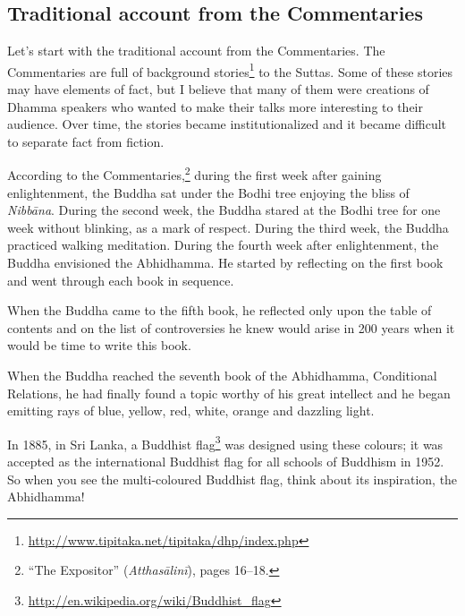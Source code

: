 \pagebreak

\subsection*{Traditional account from the Commentaries}

Let’s start with the traditional account from the Commentaries. The Commentaries are full of background stories\footnote{\url{http://www.tipitaka.net/tipitaka/dhp/index.php}} to the Suttas. Some of these stories may have elements of fact, but I believe that many of them were creations of Dhamma speakers who wanted to make their talks more interesting to their audience. Over time, the stories became institutionalized and it became difficult to separate fact from fiction.

According to the Commentaries,\footnote{“The Expositor” (\textit{Atthasālinī}), pages 16--18.} during the first week after gaining enlightenment, the Buddha sat under the Bodhi tree enjoying the bliss of \textit{Nibbāna}. During the second week, the Buddha stared at the Bodhi tree for one week without blinking, as a mark of respect. During the third week, the Buddha practiced walking meditation. During the fourth week after enlightenment, the Buddha envisioned the Abhidhamma. He started by reflecting on the first book and went through each book in sequence. 

When the Buddha came to the fifth book, he reflected only upon the table of contents and on the list of controversies he knew would arise in 200 years when it would be time to write this book.

When the Buddha reached the seventh book of the Abhidhamma, Conditional Relations, he had finally found a topic worthy of his great intellect and he began emitting rays of blue, yellow, red, white, orange and dazzling light. 

In 1885, in Sri Lanka, a Buddhist flag\footnote{\url{http://en.wikipedia.org/wiki/Buddhist_flag}} was designed using these colours; it was accepted as the international Buddhist flag for all schools of Buddhism in 1952. So when you see the multi-coloured Buddhist flag, think about its inspiration, the Abhidhamma!

